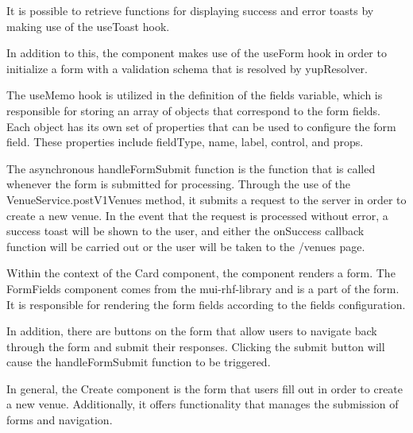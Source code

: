 \begin{justify}
\begin{itemize}
            \vspace{0.25cm}
            \newendline It is possible to retrieve functions for displaying success and error toasts by making use of the useToast hook.
            
            \vspace{0.25cm}
            \newendline In addition to this, the component makes use of the useForm hook in order to initialize a form with a validation schema that is resolved by yupResolver.
            
            \vspace{0.25cm}
            \newendline The useMemo hook is utilized in the definition of the fields variable, which is responsible for storing an array of objects that correspond to the form fields. Each object has its own set of properties that can be used to configure the form field. These properties include fieldType, name, label, control, and props.
            
            \vspace{0.25cm}
            \newendline The asynchronous handleFormSubmit function is the function that is called whenever the form is submitted for processing. Through the use of the VenueService.postV1Venues method, it submits a request to the server in order to create a new venue. In the event that the request is processed without error, a success toast will be shown to the user, and either the onSuccess callback function will be carried out or the user will be taken to the /venues page.
            
            \vspace{0.25cm}
            \newendline Within the context of the Card component, the component renders a form. The FormFields component comes from the mui-rhf-library and is a part of the form. It is responsible for rendering the form fields according to the fields configuration.
            
            \vspace{0.25cm}
            \newendline In addition, there are buttons on the form that allow users to navigate back through the form and submit their responses. Clicking the submit button will cause the handleFormSubmit function to be triggered.
            
            \vspace{0.25cm}
            \newendline In general, the Create component is the form that users fill out in order to create a new venue. Additionally, it offers functionality that manages the submission of forms and navigation.


\end{itemize}
\end{justify}
